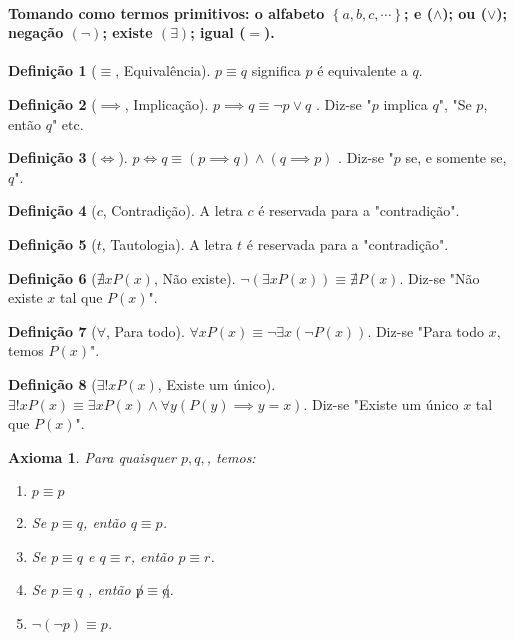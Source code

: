 \documentclass{article}
\theoremstyle{plain}
\newtheorem{axioma}{Axioma}
\theoremstyle{definition}
\newtheorem{definicao}{Definição}[section]
\theoremstyle{remark}
\begin{document}
\paragraph{Tomando como termos primitivos: o alfabeto $\left\{ a, b, c,\cdots \right\}$; e ($\land$); ou ($\lor$); negação $(\neg)$; existe $(\exists)$; igual ($=$).}
\begin{definicao}[$\equiv$, Equivalência]
	$p \equiv q$ significa $p $ é  equivalente a $q$.
\end{definicao}
\begin{definicao}[$\implies$, Implicação]
	$p \implies q \equiv \neg p \lor q$ . Diz-se "$p$ implica $q$", "Se $p$, então $q$" etc.
\end{definicao}
\begin{definicao}[$\iff$]
	$p \iff q \equiv ( p \implies q) \land (q \implies p)$ . Diz-se "$p$ se, e somente se, $q$".
\end{definicao}
\begin{definicao}[$c$, Contradição]
	A letra $c$ é reservada para a "contradição".
\end{definicao}
\begin{definicao}[$t$, Tautologia]
	A letra $t$ é reservada para a "contradição".
\end{definicao}
\begin{definicao}[$ \nexists x  P(x)$, Não existe]
	$\neg (\exists x  P(x))  \equiv \nexists  P(x)$. Diz-se "Não existe $x$ tal que $P(x)$".
\end{definicao}
\begin{definicao}[$\forall$, Para todo]
	$\forall x P(x) \equiv \neg \exists x ( \neg P(x) )$. Diz-se "Para todo $x$, temos $P(x)$".
\end{definicao}
\begin{definicao}[$ \exists! x  P(x)$, Existe um único]
	$\exists! x  P(x)  \equiv \exists x  P(x)  \land  \forall y ( P(y) \implies y =x ) $. Diz-se "Existe um único $x$ tal que $P(x)$".
\end{definicao}
\begin{axioma}
	Para quaisquer $p,q,$, temos:
	\begin{enumerate}
		\item $p\equiv p$
		\item Se $p\equiv q$, então $q\equiv p$.
		\item Se $p\equiv q$ e $q \equiv r$, então $p\equiv r$.
		\item Se $p\equiv q$ , então $\not p\equiv \not q$.
		\item $\neg (\neg p ) \equiv p$.
	\end{enumerate}
\end{axioma}
\end{document}
